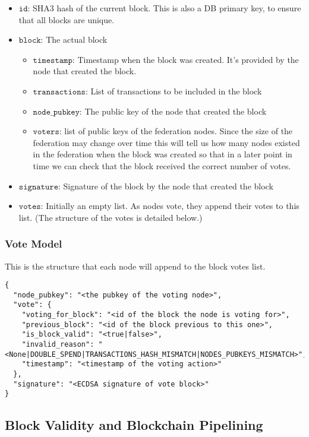 \begin{itemize}
  \item $\mathtt{id}$: SHA3 hash of the current block. This is also a DB primary key, to ensure that all blocks are unique. 
  \item $\mathtt{block}$: The actual block
    \begin{itemize}
      \item $\mathtt{timestamp}$: Timestamp when the block was created. It's provided by the node that created the block.
      \item $\mathtt{transactions}$: List of transactions to be included in the block 
      \item $\mathtt{node\_pubkey}$: The public key of the node that created the block 
      \item $\mathtt{voters}$: list of public keys of the federation nodes. Since the size of the federation may change over time this will tell us how many nodes existed in the federation when the block was created so that in a later point in time we can check that the block received the correct number of votes.
    \end{itemize}
  \item $\mathtt{signature}$: Signature of the block by the node that created the block
  \item $\mathtt{votes}$: Initially an empty list. As nodes vote, they append their votes to this list. (The structure of the votes is detailed below.)
\end{itemize}

\subsubsection{Vote Model}
This is the structure that each node will append to the block votes list. 

\begin{lstlisting}[style=json]
{
  "node_pubkey": "<the pubkey of the voting node>",
  "vote": {
    "voting_for_block": "<id of the block the node is voting for>",
    "previous_block": "<id of the block previous to this one>", 
    "is_block_valid": "<true|false>", 
    "invalid_reason": "<None|DOUBLE_SPEND|TRANSACTIONS_HASH_MISMATCH|NODES_PUBKEYS_MISMATCH>", 
    "timestamp": "<timestamp of the voting action>" 
  },
  "signature": "<ECDSA signature of vote block>" 
}
\end{lstlisting}


\subsection{Block Validity and Blockchain Pipelining}

